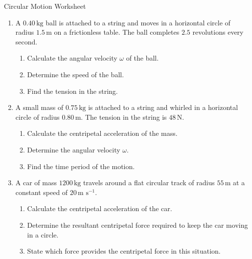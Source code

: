 \documentclass[12pt]{article}
\begin{document}
\begin{center}
    {\LARGE Circular Motion Worksheet}\\[0.5em]
\end{center}

\vspace{1em}

\begin{enumerate}[label=\textbf{\arabic*.}, itemsep=2em]

\item
A \(0.40\,\text{kg}\) ball is attached to a string and moves in a horizontal circle of radius \(1.5\,\text{m}\) on a frictionless table. The ball completes \(2.5\) revolutions every second.

\begin{enumerate}[label=(\alph*)]
    \item Calculate the angular velocity \(\omega\) of the ball.
    \item Determine the speed of the ball.
    \item Find the tension in the string.
\end{enumerate}

\item
A small mass of \(0.75\,\text{kg}\) is attached to a string and whirled in a horizontal circle of radius \(0.80\,\text{m}\). The tension in the string is \(48\,\text{N}\).

\begin{enumerate}[label=(\alph*)]
    \item Calculate the centripetal acceleration of the mass.
    \item Determine the angular velocity \(\omega\).
    \item Find the time period of the motion.
\end{enumerate}

\item
A car of mass \(1200\,\text{kg}\) travels around a flat circular track of radius \(55\,\text{m}\) at a constant speed of \(20\,\text{m s}^{-1}\).

\begin{enumerate}[label=(\alph*)]
    \item Calculate the centripetal acceleration of the car.
    \item Determine the resultant centripetal force required to keep the car moving in a circle.
    \item State which force provides the centripetal force in this situation.
\end{enumerate}


\end{enumerate}
\end{document}
